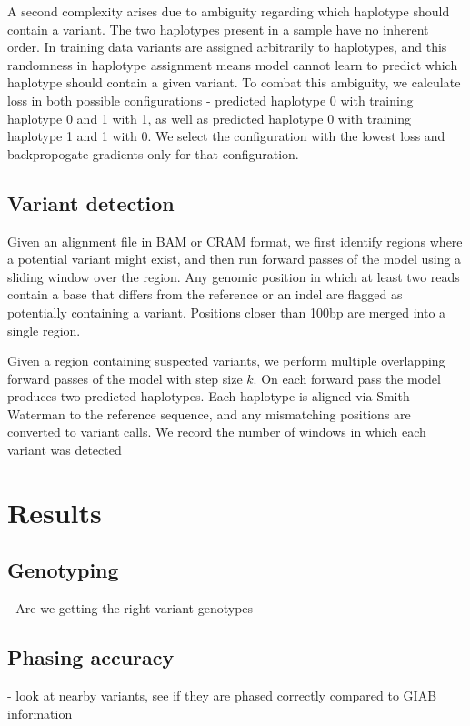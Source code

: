 \documentclass[]{article}
\begin{document}
A second complexity arises due to ambiguity regarding which haplotype should contain a variant. The two haplotypes present in a sample have no inherent order. In training data variants are assigned arbitrarily to haplotypes, and this randomness in haplotype assignment means model cannot learn to predict which haplotype should contain a given variant. To combat this ambiguity, we calculate loss in both possible configurations - predicted haplotype 0 with training haplotype 0 and 1 with 1, as well as predicted haplotype 0 with training haplotype 1 and 1 with 0. We select the configuration with the lowest loss and backpropogate gradients only for that configuration. 


\subsection{Variant detection}

Given an alignment file in BAM or CRAM format, we first identify regions where a potential variant might exist, and then run forward passes of the model using a sliding window over the region. Any genomic position in which at least two reads contain a base that differs from the reference or an indel are flagged as potentially containing a variant. Positions closer than 100bp are merged into a single region. 

Given a region containing suspected variants, we perform multiple overlapping forward passes of the model with step size $k$. On each forward pass the model produces two predicted haplotypes. Each haplotype is aligned via Smith-Waterman to the reference sequence, and any mismatching positions are converted to variant calls. We record the number of windows in which each variant was detected

\section{Results}

\subsection{Genotyping}
 - Are we getting the right variant genotypes

\subsection{Phasing accuracy}
 - look at nearby variants, see if they are phased correctly compared to GIAB information
\end{document}
